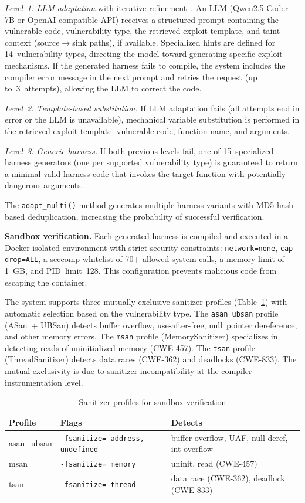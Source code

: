 \documentclass[runningheads]{llncs}
\begin{document}
\textit{Level~1: LLM adaptation} with iterative refinement~\cite{gajjar2026vbf}. An LLM (Qwen2.5-Coder-7B or OpenAI-compatible API) receives a structured prompt containing the vulnerable code, vulnerability type, the retrieved exploit template, and taint context (source$\to$sink paths), if available. Specialized hints are defined for 14~vulnerability types, directing the model toward generating specific exploit mechanisms. If the generated harness fails to compile, the system includes the compiler error message in the next prompt and retries the request (up to~3~attempts), allowing the LLM to correct the code.

\textit{Level~2: Template-based substitution.} If LLM adaptation fails (all attempts end in error or the LLM is unavailable), mechanical variable substitution is performed in the retrieved exploit template: vulnerable code, function name, and arguments.

\textit{Level~3: Generic harness.} If both previous levels fail, one of 15~specialized harness generators (one per supported vulnerability type) is guaranteed to return a minimal valid harness code that invokes the target function with potentially dangerous arguments.

The \texttt{adapt\_multi()} method generates multiple harness variants with MD5-hash-based deduplication, increasing the probability of successful verification.

\textbf{Sandbox verification.} Each generated harness is compiled and executed in a Docker-isolated environment with strict security constraints: \texttt{network=none}, \texttt{cap-drop=ALL}, a seccomp whitelist of 70+ allowed system calls, a memory limit of 1~GB, and PID~limit~128. This configuration prevents malicious code from escaping the container.

The system supports three mutually exclusive sanitizer profiles (Table~\ref{tab:sanitizers}) with automatic selection based on the vulnerability type. The \texttt{asan\_ubsan} profile (ASan~+ UBSan) detects buffer overflow, use-after-free, null~pointer dereference, and other memory errors. The \texttt{msan} profile (MemorySanitizer) specializes in detecting reads of uninitialized memory (CWE-457). The \texttt{tsan} profile (ThreadSanitizer) detects data races (CWE-362) and deadlocks (CWE-833). The mutual exclusivity is due to sanitizer incompatibility at the compiler instrumentation level.

\begin{table}
\centering
\caption{Sanitizer profiles for sandbox verification}
\label{tab:sanitizers}
\small
\begin{tabular}{|l|p{3.2cm}|p{4.0cm}|}
\hline
\textbf{Profile} & \textbf{Flags} & \textbf{Detects} \\
\hline
asan\_ubsan & \texttt{-fsanitize= address, undefined} & buffer overflow, UAF, null deref, int overflow \\
msan & \texttt{-fsanitize= memory} & uninit. read (CWE-457) \\
tsan & \texttt{-fsanitize= thread} & data race (CWE-362), deadlock (CWE-833) \\
\hline
\end{tabular}
\end{table}
\end{document}
